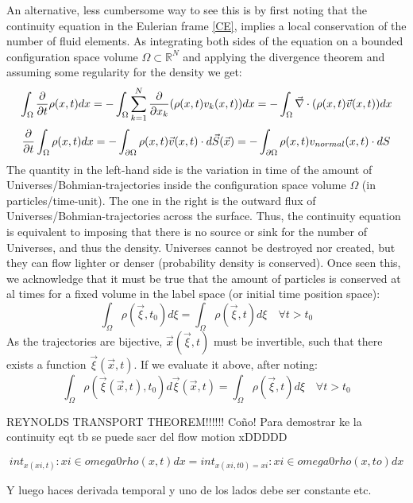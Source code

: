 \documentclass[11pt, a4paper]{article} %
\newcommand{\R}{\mathbb{R}} %
\DeclareRobustCommand{\mybox}[2][gray!20]{%
\begin{tcolorbox}[   %
        left=1cm,
        right=1cm,
        top=0.5cm,
        bottom=0.5cm,
        colback=#1,
        colframe=#1,
        width=\dimexpr\textwidth\relax, 
        enlarge left by=0mm,
        boxsep=5pt,
        arc=0pt,outer arc=0pt,
        ]
        #2
\end{tcolorbox}
}
\begin{document}
\mybox{
An alternative, less cumbersome way to see this is by first noting that the continuity equation in the Eulerian frame \eqref{CE}, implies a local conservation of the number of fluid elements. As integrating both sides of the equation on a bounded configuration space volume $\Omega\subset\R^N$ and applying the divergence theorem and assuming some regularity for the density we get:
$$
\int_{\Omega}\pdv{}{t} \rho(x,t) dx=-\int_{\Omega}\sum_{k=1}^N \pdv{}{x_k}\qty( \rho(x,t)v_k(x,t) )dx=-\int_{\Omega}\vec{\nabla}\cdot \qty( \rho(x,t)\vec{v}(x,t) )dx
$$
\begin{equation}
\pdv{}{t} \int_{\Omega} \rho(x,t) dx=-\int_{\partial \Omega} \rho(x,t)\vec{v}(x,t)\cdot d\vec{S}(\vec{x})=-\int_{\partial \Omega} \rho(x,t)v_{normal}(x,t)\cdot dS
\end{equation}
The quantity in the left-hand side is the variation in time of the amount of Universes/Bohmian-trajectories inside the configuration space volume $\Omega$ (in particles/time-unit). The one in the right is the outward flux of Universes/Bohmian-trajectories across the surface. Thus, the continuity equation is equivalent to imposing that there is no source or sink for the number of Universes, and thus the density. Universes cannot be destroyed nor created, but they can flow lighter or denser (probability density is conserved). Once seen this, we acknowledge that it must be true that the amount of particles is conserved at al times for a fixed volume in the label space (or initial time position space):
\begin{equation}
\int_{\Omega} \rho(\vec{\xi},t_0) d\xi=\int_{\Omega} \rho(\vec{\xi},t) d\xi \quad \forall t>t_0
\end{equation}
As the trajectories are bijective, $\vec{x}(\vec{\xi},t)$ must be invertible, such that there exists a function $\vec{\xi}(\vec{x},t)$. If we evaluate it above, after noting:
\begin{equation}
\int_{\Omega} \rho(\vec{\xi}(\vec{x},t),t_0) d\vec{\xi}(\vec{x},t)=\int_{\Omega} \rho(\vec{\xi},t) d\xi \quad \forall t>t_0
\end{equation}

REYNOLDS TRANSPORT THEOREM!!!!!! Coño! Para demostrar ke la continuity eqt tb se puede sacr del flow motion xDDDDD

$$int_{x(xi,t)}: xi\in omega0 rho(x,t)dx = int_{x(xi,t0)=xi}: xi \in omega0 rho(x,to)dx$$

Y luego haces derivada temporal y uno de los lados debe ser constante etc.}
\end{document}
